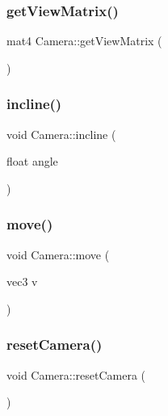 \mbox{\label{classCamera_a26c21a39c99b37158c16b0b16a3b0a56}} 
\subsubsection{\texorpdfstring{get\+View\+Matrix()}{getViewMatrix()}}
{\footnotesize\ttfamily mat4 Camera\+::get\+View\+Matrix (\begin{DoxyParamCaption}{ }\end{DoxyParamCaption})}

\mbox{\label{classCamera_add348dd18fb069dfad8ff7c941adf2d4}} 
\subsubsection{\texorpdfstring{incline()}{incline()}}
{\footnotesize\ttfamily void Camera\+::incline (\begin{DoxyParamCaption}\item[{float}]{angle }\end{DoxyParamCaption})}

\mbox{\label{classCamera_a35d93a9130ec85a19d76154ee8fc8b2b}} 
\subsubsection{\texorpdfstring{move()}{move()}}
{\footnotesize\ttfamily void Camera\+::move (\begin{DoxyParamCaption}\item[{vec3}]{v }\end{DoxyParamCaption})}

\mbox{\label{classCamera_aee8027b5309a5dc77db956d27924c387}} 
\subsubsection{\texorpdfstring{reset\+Camera()}{resetCamera()}}
{\footnotesize\ttfamily void Camera\+::reset\+Camera (\begin{DoxyParamCaption}{ }\end{DoxyParamCaption})}

